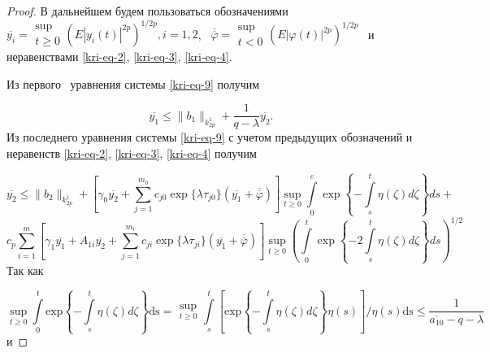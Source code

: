 \begin{proof}
В дальнейшем будем пользоваться обозначениями \  $\overline{y_i}=\begin{matrix}\sup\\t\ge
0\end{matrix}\left(E|y_i(t)|^{2p}\right)^{1/2p},i=1,2$, \  $\overline{\overline{\varphi
}}=\begin{matrix}\sup\\t<0\end{matrix}\left(E|\varphi (t)|^{2p}\right)^{1/2p}$ \ и неравенствами \eqref{kri-eq-2}, \eqref{kri-eq-3}, \eqref{kri-eq-4}.

Из первого \ уравнения системы \eqref{kri-eq-9} получим

\begin{equation*}
\overline{y_1}\le \|b_1\|_{k_{2p}^1}+\frac 1{q-\lambda }\overline{y_2}.
\end{equation*}
Из последнего уравнения системы \eqref{kri-eq-9} с учетом предыдущих обозначений и неравенств \eqref{kri-eq-2}, \eqref{kri-eq-3}, \eqref{kri-eq-4} получим

\begin{equation*}
  \overline{y_2} \leq \|b_2\|_{k_{2p}^1} + \left[ \gamma_0 \overline{y_2} + \sum\limits_{j=1}^{m_0} c_{j0} \exp\{\lambda\tau_{j0}\}(\overline{y_1}+\overline{\overline{\varphi}}) \right]
\sup\limits_{t\geq0} \int\limits_{0}^{e} \exp\left\{-\int\limits_{s}^{t} \eta(\zeta)d\zeta\right\}ds +
\end{equation*}
\begin{equation}\label{kri-eq-10}
c_p \sum\limits_{i=1}^{m} \left[\gamma_1\overline{y_1}+A_{1i}\overline{y_2}+\sum\limits_{j=1}^{m_i} c_{ji}\exp \{\lambda\tau_{ji}\}(\overline{y_1}+\overline{\overline{\varphi}})\right]
\sup\limits_{t\geq0} \left(\int\limits_{0}^{t}\exp\left\{ -2\int\limits_{s}^{t} \eta(\zeta)d\zeta \right\} ds \right)^{1/2}
\end{equation}
%
Так как

\begin{equation*}
\sup\limits_{t\ge 0}\overset t{\underset 0{\int }}\text{exp}\left\{-\overset t{\underset s{\int
}}\eta (\zeta )\mathit{d\zeta }\right\}\text{ds}=\begin{matrix}\sup\limits_{t\ge
0}\end{matrix}\overset t{\underset s{\int }}\left[\text{exp}\left\{-\overset t{\underset s{\int }}\eta (\zeta
)\mathit{d\zeta }\right\}\eta (s)\right]/\eta (s)\text{ds}\le \frac 1{\overline{a_{10}}-q-\lambda }
\end{equation*}
и


\end{proof}
